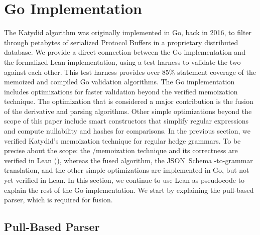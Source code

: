 \documentclass[runningheads]{llncs}
\newcommand{\enter}{\link{enter}{def enter}}
\newcommand{\leave}{\link{leave}{def leave}}
\newcommand{\JSONSchema}{%
  JSON~Schema\xspace%
}
\begin{document}
\section{Go Implementation}
\label{section_go}

The Katydid algorithm was originally implemented in Go, back in 2016, to filter through petabytes of serialized Protocol Buffers in a proprietary distributed database.
We provide a direct connection between the Go implementation and the formalized Lean implementation, using a test harness to validate the two against each other.
This test harness provides over 85\% statement coverage of the memoized and compiled Go validation algorithms.
The Go implementation includes optimizations for faster validation beyond the verified memoization technique.
The optimization that is considered a major contribution is the fusion of the derivative and parsing algorithms.
Other simple optimizations beyond the scope of this paper include smart constructors that simplify regular expressions and compute nullability and hashes for comparisons.
In the previous section, we verified Katydid's memoization technique for regular hedge grammars.
To be precise about the scope: the \enter/\leave memoization technique and its correctness are verified in Lean (), whereas the fused algorithm, the \JSONSchema-to-grammar translation, and the other simple optimizations are implemented in Go, but not yet verified in Lean.
In this section, we continue to use Lean as pseudocode to explain the rest of the Go implementation.
We start by explaining the pull-based parser, which is required for fusion.

\subsection{Pull-Based Parser}
\end{document}
